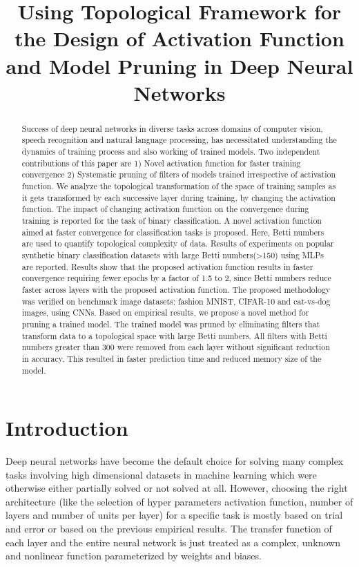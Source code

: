\documentclass{bmvc2k}
\title{Using Topological Framework for the Design of  Activation Function and Model Pruning in Deep Neural Networks}
\begin{document}
\maketitle

\begin{abstract}
    Success of deep neural networks in diverse tasks across domains of computer vision, speech recognition and natural language processing, has necessitated understanding the dynamics of training process and also working of trained models.
    Two independent contributions of this paper are 1) Novel activation function for faster training convergence  2) Systematic pruning of filters of models trained irrespective of activation function.
    We analyze the topological transformation of the space of training samples as it gets transformed by each successive layer during training, by changing the activation function.
    The impact of changing activation function on the convergence during training is reported for the task of binary classification.
    A novel activation function aimed at faster convergence for classification tasks is proposed.
    Here, Betti numbers are used to quantify topological complexity of data.
    Results of experiments on popular synthetic binary classification datasets with large Betti numbers(>150) using MLPs are reported.
    Results show that the proposed activation function results in faster convergence requiring fewer epochs by a factor of 1.5  to 2, since Betti numbers reduce faster across layers with the proposed activation function.
    The proposed methodology was verified on benchmark image datasets: fashion MNIST, CIFAR-10 and cat-vs-dog images, using CNNs.
    Based on empirical results, we propose a novel method for pruning a trained model.
    The trained model was pruned by eliminating filters that transform data to a topological space with large Betti numbers.
    All filters with Betti numbers greater than 300 were removed from each layer without significant reduction in accuracy.
    This resulted in faster prediction time and reduced memory size of the model.
\end{abstract}

\section{Introduction}
\label{sec:intro}
Deep neural networks have become the default choice for solving many  complex tasks involving high dimensional datasets in machine learning which were otherwise either partially solved or not solved at all.
However, choosing the right architecture (like the  selection  of hyper parameters activation function, number of layers and number of units per layer)  for a specific task is mostly based on trial and error or based on the previous empirical results.
The transfer function of each layer and the entire neural network is just treated as a complex, unknown and nonlinear function parameterized by weights and biases.
\end{document}
